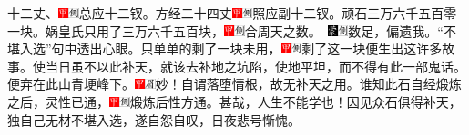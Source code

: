 十二丈、{\includegraphics[width=3mm]{../Images/00002}\includegraphics[width=3mm]{../Images/00011}\footnotesize 总应十二钗。}方经二十四丈{\includegraphics[width=3mm]{../Images/00002}\includegraphics[width=3mm]{../Images/00011}\footnotesize 照应副十二钗。}顽石三万六千五百零一块。娲皇氏只用了三万六千五百块，{{\includegraphics[width=3mm]{../Images/00002}\includegraphics[width=3mm]{../Images/00011}\footnotesize 合周天之数。　}\includegraphics[width=3mm]{../Images/00006}\includegraphics[width=3mm]{../Images/00011}\footnotesize 数足，偏遗我。``不堪入选''句中透出心眼。}只单单的剩了一块未用，{\includegraphics[width=3mm]{../Images/00002}\includegraphics[width=3mm]{../Images/00011}\footnotesize 剩了这一块便生出这许多故事。使当日虽不以此补天，就该去补地之坑陷，使地平坦，而不得有此一部鬼话。}便弃在此山青埂峰下。{\includegraphics[width=3mm]{../Images/00002}\includegraphics[width=3mm]{../Images/00010}\footnotesize  妙！自谓落堕情根，故无补天之用。}谁知此石自经煅炼之后，灵性已通，{\includegraphics[width=3mm]{../Images/00002}\includegraphics[width=3mm]{../Images/00011}\footnotesize 煅炼后性方通。甚哉，人生不能学也！}因见众石俱得补天，独自己无材不堪入选，遂自怨自叹，日夜悲号惭愧。

